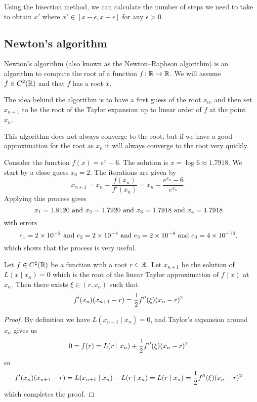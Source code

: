 \documentclass[11pt,a4paper]{article}
\begin{document}
\begin{remark}
  Using the bisection method, we can calculate the number of steps we need to
  take to obtain $x'$ where $x' \in [x - \epsilon, x + \epsilon]$ for any
  $\epsilon > 0$.
\end{remark}


\subsection{Newton's algorithm}
Newton's algorithm (also known as the Newton--Raphson algorithm) is an algorithm
to compute the root of a function $f \colon \mathbb{R} \to \mathbb{R}$.
We will assume $f \in C^2(\mathbb{R})$ and that $f$ has a root $x$.

The idea behind the algorithm is to have a first guess of the root $x_0$,
and then set $x_{n+1}$ to be the root of the Taylor expansion up to linear
order of $f$ at the point $x_n$.

This algorithm does not always converge to the root,
but if we have a good approximation for the root as $x_0$ it will always
converge to the root very quickly.

\begin{example}
  Consider the function $f(x) = e^x - 6$.
  The solution is $x = \log 6 \approx 1.7918$.
  We start by a close guess $x_0 = 2$.
  The iterations are given by
  \[
    x_{n + 1} =
    x_n - \frac{f(x_n)}{f'(x_n)} =
    x_n - \frac{e^{x_n} - 6}{e^{x_n}}.
  \]
  Applying this process gives
  \[
    x_1 = 1.8120 \text{ and }
    x_2 = 1.7920 \text{ and }
    x_3 = 1.7918 \text{ and }
    x_4 = 1.7918
  \]
  with errors
  \[
    e_1 = 2 \times 10^{-2} \text{ and }
    e_2 = 2 \times 10^{-4} \text{ and }
    e_3 = 2 \times 10^{-8} \text{ and }
    e_4 = 4 \times 10^{-16}.
  \]
  which shows that the process is very useful.
\end{example}

\begin{lemma}
  \label{lem:newton-local}
  Let $f \in C^2(\mathbb{R})$ be a function with a root $r \in \mathbb{R}$.
  Let $x_{n + 1}$ be the solution of $L(x \mid x_n) = 0$ which is
  the root of the linear Taylor approximation of $f(x)$ at $x_n$.
  Then there exists $\xi \in (r,x_n)$ such that
  \[
    f'(x_n)(x_{n+1} - r) = \frac{1}{2} f''(\xi)(x_n - r)^2
  \]
\end{lemma}
\begin{proof}
  By definition we have $L(x_{n + 1} \mid x_n) = 0$, and Taylor's expansion
  around $x_n$ gives us
  \[
    0 = f(r) = L(r \mid x_n) + \frac{1}{2} f''(\xi)(x_n - r)^2
  \]
  so
  \[
    f'(x_n)(x_{n+1} - r) = L(x_{n + 1} \mid x_n) - L(r \mid x_n) =
    L(r \mid x_n) = \frac{1}{2} f''(\xi)(x_n - r)^2
  \]
  which completes the proof.
\end{proof}
\end{document}
